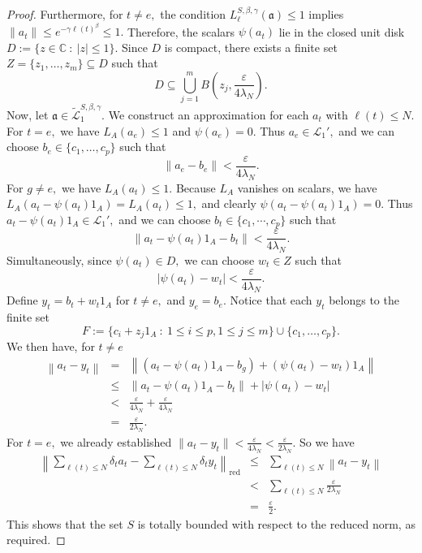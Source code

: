 \documentclass[a4paper,11pt,reqno]{amsart}
\theoremstyle{plain}
\theoremstyle{mainthmstyle}
\theoremstyle{named}
\numberwithin{equation}{section}
\newcommand{\Bea}{\begin{eqnarray*}}
\newcommand{\Eea}{\end{eqnarray*}}
\begin{document}
\begin{proof}
Furthermore, for $t \neq e,$ the condition $L_{\ell}^{S, \beta, \gamma}(\mathfrak{a}) \leq 1$ implies $\|a_t\| \leq e^{-\gamma \ell(t)^\beta} \leq 1.$ Therefore, the scalars $\psi (a_t)$ lie in the closed unit disk $D := \{z \in \mathbb{C} \ : \ |z| \leq 1\}.$ Since $D$ is compact, there exists a finite set $Z = \{z_1, \dots, z_m\} \subseteq D$ such that
$$D \subseteq \bigcup_{j=1}^m B\left(z_j, \frac{\varepsilon}{4 \lambda_N}\right).$$
Now, let $\mathfrak{a} \in \widetilde{\mathcal{L}}_1^{S, \beta, \gamma}.$ We construct an approximation for each $a_t$ with $\ell(t) \leq N.$ 
For $t = e,$ we have $L_A(a_e) \leq 1$ and $\psi (a_e) = 0.$ Thus $a_e \in \mathcal{L}_1',$ and we can choose $b_e \in \{c_1, \dots, c_p\}$ such that
$$\left \|a_e - b_e \right \| < \frac{\varepsilon}{4 \lambda_N}.$$
For $g \neq e,$ we have $L_A(a_t) \leq 1.$ Because $L_A$ vanishes on scalars, we have $L_A(a_t - \psi(a_t)1_A) = L_A(a_t) \leq 1,$ and clearly $\psi (a_t - \psi(a_t)1_A) = 0.$ Thus $a_t - \psi(a_t)1_A \in \mathcal{L}_1',$ and we can choose $b_t \in \{c_1, \cdots, c_p\}$ such that
$$\left \|a_t - \psi (a_t) 1_A - b_t \right \| < \frac {\varepsilon} {4 \lambda_N}.$$
Simultaneously, since $\psi(a_t) \in D,$ we can choose $w_t \in Z$ such that 
$$\left |\psi (a_t) - w_t \right | < \frac{\varepsilon}{4 \lambda_N}.$$
Define $y_t = b_t + w_t 1_A$ for $t \neq e,$ and $y_e = b_e.$ Notice that each $y_t$ belongs to the finite set
$$F := \{ c_i + z_j 1_A \ : \ 1 \leq i \leq p, 1 \leq j \leq m \} \cup \{c_1, \dots, c_p\}.$$ 
We then have, for $t \neq e$
\Bea
\left \| a_t - y_t \right \| & = & \left \| (a_t - \psi (a_t)1_A - b_g) + (\psi (a_t) - w_t)1_A \right \| \\
& \leq & \left \| a_t - \psi (a_t)1_A - b_t \right \| + \left | \psi (a_t) - w_t \right | \\
& < & \frac{\varepsilon}{4 \lambda_N} + \frac{\varepsilon}{4 \lambda_N} \\ & = & \frac{\varepsilon}{2 \lambda_N}.
\Eea
For $t = e,$ we already established $\|a_t - y_t\| < \frac{\varepsilon}{4 \lambda_N} < \frac {\varepsilon} {2 \lambda_N}.$
So we have
\Bea
\left \|\sum\limits_{\ell (t) \leq N} \delta_t a_t - \sum\limits_{\ell (t) \leq N} \delta_t y_t \right \|_{\mathrm{red}} & \leq & \sum\limits_{\ell (t) \leq N} \left \|a_t - y_t \right \| \\
& < & \sum\limits_{\ell (t) \leq N} \frac{\varepsilon}{2 \lambda_N} \\ & = & \frac{\varepsilon}{2}.
\Eea
This shows that the set $S$ is totally bounded with respect to the reduced norm, as required.
\end{proof}
\end{document}
